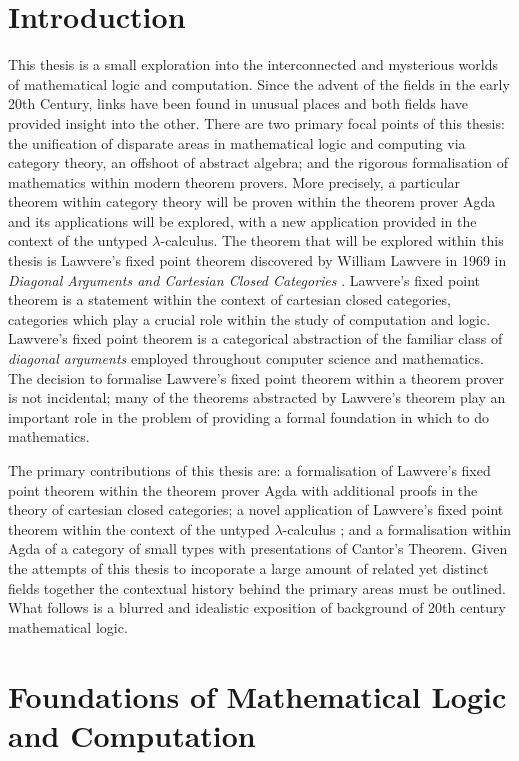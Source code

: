 
\section{Introduction}

This thesis is a small exploration into the interconnected and mysterious worlds
of mathematical logic and computation. Since the advent of the fields in the
early 20th Century, links have been found in unusual places and both fields have
provided insight into the other. There are two primary focal points of this
thesis: the unification of disparate areas in mathematical logic and computing
via category theory, an offshoot of abstract algebra; and the rigorous
formalisation of mathematics within modern theorem provers. More precisely, a
particular theorem within category theory will be proven within the theorem
prover Agda and its applications will be explored, with a new application
provided in the context of the untyped $\lambda$-calculus. The theorem that will
be explored within this thesis is Lawvere's fixed point theorem discovered by
William Lawvere in 1969 in \textit{Diagonal Arguments and Cartesian Closed
Categories} \cite{lawvere1969diagonal}. Lawvere's fixed point theorem
is a statement within the context of cartesian closed categories, categories
which play a crucial role within the study of computation and logic. Lawvere's
fixed point theorem is a categorical abstraction of the familiar class of
\textit{diagonal arguments} employed throughout computer science and mathematics. The
decision to formalise Lawvere's fixed point theorem within a theorem prover is
not incidental; many of the theorems abstracted by Lawvere's theorem play an
important role in the problem of providing a formal foundation in which to do
mathematics.

The primary contributions of this thesis are: a formalisation of Lawvere's fixed
point theorem within the theorem prover Agda with additional proofs in the
theory of cartesian closed categories; a novel application of Lawvere's fixed
point theorem within the context of the untyped $\lambda$-calculus ; and a
formalisation within Agda of a category of small types with presentations of
Cantor's Theorem. Given the attempts of this thesis to incoporate a large amount
of related yet distinct fields together the contextual history behind the
primary areas must be outlined. What follows is a blurred and idealistic
exposition of background of 20th century mathematical logic.
\section{Foundations of Mathematical Logic and Computation}

